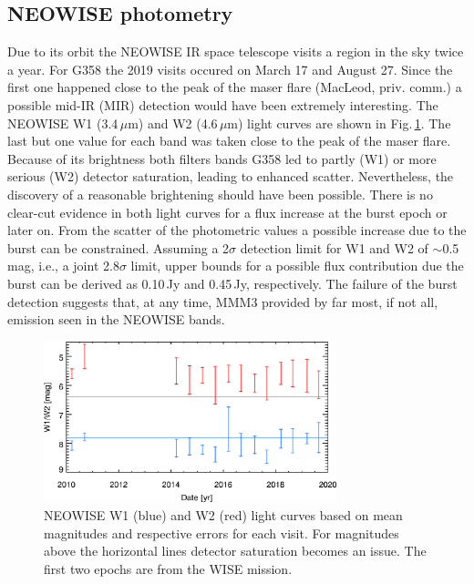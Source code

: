 \documentclass[longauth,usenatbib]{aa}
\begin{document}
\subsection{NEOWISE photometry}\label{rneo}
Due to its orbit the NEOWISE IR space telescope visits a region in the sky twice a year. For G358 the 2019 visits occured on March 17 and August 27. Since the first one happened close to the peak of the maser flare (MacLeod, priv. comm.) a possible mid-IR (MIR) detection would have been extremely interesting. 
The NEOWISE W1 (3.4\,$\mu$m) and W2 (4.6\,$\mu$m) light curves are shown in Fig.\,\ref{fig:NW_lc}. The last but one value for each band was taken close to the peak of the maser flare. 
Because of its brightness both filters bands G358 led to partly (W1) or more serious (W2) detector saturation, leading to enhanced scatter. %
Nevertheless, the discovery of a reasonable brightening should have been possible. There is no clear-cut evidence in both light curves for a flux increase at the burst epoch or later on.
From the scatter of the photometric values a possible increase due to the burst can be constrained. Assuming a 2$\sigma$ detection limit for W1 and W2 of $\sim$0.5\,mag, i.e., a joint 2.8$\sigma$ limit, upper bounds for a possible flux contribution due the burst can be derived as 0.10\,Jy and 0.45\,Jy, respectively. 
The failure of the burst detection suggests that, at any time, MMM3 provided by far most, if not all, emission seen in the NEOWISE bands. 
\begin{figure}
    \centering
	\includegraphics[width=8.5cm]{G358_W1_W2.png}
	\caption{NEOWISE W1 (blue) and W2 (red) light curves based on mean magnitudes and respective errors for each visit. For magnitudes above the horizontal lines detector saturation becomes an issue. The first two epochs are from the WISE mission.
	}
 \label{fig:NW_lc}
\end{figure}
\end{document}
